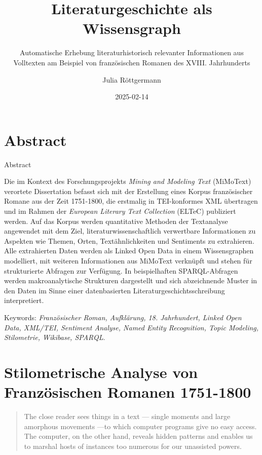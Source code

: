 \documentclass[
  12pt,
  letterpaper,
]{classicthesis}
\title{Literaturgeschichte als Wissensgraph}
\subtitle{Automatische Erhebung literaturhistorisch relevanter
Informationen aus Volltexten am Beispiel von französischen Romanen des
XVIII. Jahrhunderts}
\author{Julia Röttgermann}
\date{2025-02-14}
\renewcommand*\contentsname{Table of contents}
\newcommand\contentsname{Table of contents}
\begin{document}
\maketitle

\renewcommand*\contentsname{Table of contents}
{
\hypersetup{linkcolor=}
\setcounter{tocdepth}{2}
\tableofcontents
}


\chapter*{Abstract}\label{abstract}


Abstract

Die im Kontext des Forschungsprojekts \emph{Mining and Modeling Text}
(MiMoText) verortete Dissertation befasst sich mit der Erstellung eines
Korpus französischer Romane aus der Zeit 1751-1800, die erstmalig in
TEI-konformes XML übertragen und im Rahmen der \emph{European Literary
Text Collection} (ELTeC) publiziert werden. Auf das Korpus werden
quantitative Methoden der Textanalyse angewendet mit dem Ziel,
literaturwissenschaftlich verwertbare Informationen zu Aspekten wie
Themen, Orten, Textähnlichkeiten und Sentiments zu extrahieren. Alle
extrahierten Daten werden als Linked Open Data in einem Wissensgraphen
modelliert, mit weiteren Informationen aus MiMoText verknüpft und stehen
für strukturierte Abfragen zur Verfügung. In beispielhaften
SPARQL-Abfragen werden makroanalytische Strukturen dargestellt und sich
abzeichnende Muster in den Daten im Sinne einer datenbasierten
Literaturgeschichtsschreibung interpretiert.

Keywords: \emph{Französischer Roman, Aufklärung, 18. Jahrhundert, Linked
Open Data, XML/TEI, Sentiment Analyse, Named Entity Recognition, Topic
Modeling, Stilometrie, Wikibase, SPARQL}.


\chapter{\texorpdfstring{\textbf{Stilometrische Analyse von
Französischen Romanen
1751-1800}}{Stilometrische Analyse von Französischen Romanen 1751-1800}}\label{stilometrische-analyse-von-franzuxf6sischen-romanen-1751-1800}

\begin{quote}
The close reader sees things in a text --- single moments and large
amorphous movements ---to which computer programs give no easy access.
The computer, on the other hand, reveals hidden patterns and enables us
to marshal hosts of instances too numerous for our unassisted powers.
\end{quote}
\end{document}
